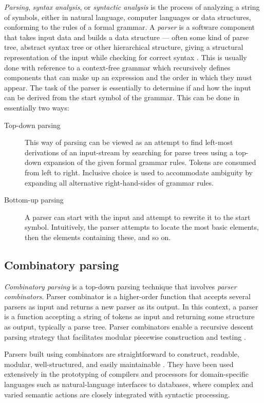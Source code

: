 \documentclass[english,engineering]{wizthesis}
\begin{document}
\emph{Parsing}, \emph{syntax analysis}, or \emph{syntactic analysis} is the
process of analyzing a string of symbols, either in natural language, computer
languages or data structures, conforming to the rules of a formal grammar. A
\emph{parser} is a software component that takes input data and builds a data
structure --- often some kind of parse tree, abstract syntax tree or other
hierarchical structure, giving a structural representation of the input while
checking for correct syntax \cite{aho-2019,sipser-2009}. This is usually done with reference
to a context-free grammar which recursively defines components that can make up
an expression and the order in which they must appear. The task of the parser is
essentially to determine if and how the input can be derived from the start
symbol of the grammar. This can be done in essentially two ways:
\begin{description}
  \item[Top-down parsing] This way of parsing can be viewed as an attempt to
  find left-most derivations of an input-stream by searching for parse trees
  using a top-down expansion of the given formal grammar rules. Tokens are
  consumed from left to right. Inclusive choice is used to accommodate ambiguity
  by expanding all alternative right-hand-sides of grammar rules.
  \item[Bottom-up parsing] A parser can start with the input and attempt to
  rewrite it to the start symbol. Intuitively, the parser attempts to locate the
  most basic elements, then the elements containing these, and so on.
\end{description}

\subsection{Combinatory parsing}

\emph{Combinatory parsing} is a top-down parsing technique that involves
\emph{parser combinators}. Parser combinator is a higher-order function that
accepts several parsers as input and returns a new parser as its output. In this
context, a parser is a function accepting a string of tokens as input and
returning some structure as output, typically a parse tree. Parser combinators
enable a recursive descent parsing strategy that facilitates modular piecewise
construction and testing \cite{swierstra-2009}.

Parsers built using combinators are straightforward to construct, readable,
modular, well-structured, and easily maintainable \cite{swierstra-2009}. They
have been used extensively in the prototyping of compilers and processors for
domain-specific languages such as natural-language interfaces to databases,
where complex and varied semantic actions are closely integrated with syntactic
processing.
\end{document}
